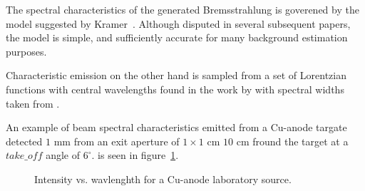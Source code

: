 The spectral characteristics of the generated Bremsstrahlung is goverened by
the model suggested by Kramer~\cite{kramers1923}. Although disputed in several
subsequent papers, the model is simple, and sufficiently accurate for many
background estimation purposes.

Characteristic emission on the other hand is sampled from a set of Lorentzian
functions with central wavelengths found in the work by \cite{bearden1967x} with
spectral widths taken from \cite{krause1979natural}.

An example of beam spectral characteristics emitted from a Cu-anode targate detected $1$ mm  from an exit aperture of $1\times 1$ cm $10$ cm fround the target at a $take\_off$ angle of $6^\circ$. is seen in figure~\ref{f:source_lab_spectrum}.
\begin{figure}
\label{f:source_lab_spectrum}
\caption{Intensity vs. wavlenghth for a Cu-anode laboratory source.}
\end{figure}
